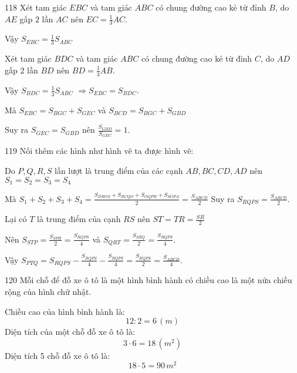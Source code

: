 \begin{Answer}{118}
		Xét tam giác $EBC$ và tam giác $ABC$ có chung đường cao kẻ từ đỉnh $B$, do $AE$ gấp $2$ lần $AC$ nên  $EC=\frac{1}{3}AC.$
		
		Vậy  ${{S}_{EBC}}=\frac{1}{3}{{S}_{ABC}}$
		
		Xét tam giác $BDC$ và tam giác $ABC$ có chung đường cao kẻ từ đỉnh $C$, do $AD$ gấp $2$ lần $BD$ nên  $BD=\frac{1}{3}AB.$
		
		Vậy  ${{S}_{BDC}}=\frac{1}{3}{{S}_{ABC}}$
		$\Rightarrow {{S}_{EBC}}={{S}_{BDC}}$.
		
		Mà  ${{S}_{EBC}}={{S}_{BGC}}+{{S}_{GEC}}$ và  ${{S}_{BCD}}={{S}_{BGC}}+{{S}_{GBD}}$
		
		Suy ra  ${{S}_{GEC}}={{S}_{GBD}}$  nên  $\frac{{{S}_{GBD}}}{{{S}_{GEC}}}=1$.
	
\end{Answer}
\begin{Answer}{119}
		Nối thêm các hình như hình vẽ ta được hình vẽ:
		
		
		Do $P,Q,R,S$ lần lượt là trung điểm của các cạnh $AB,BC,CD,AD$ nên  ${{S}_{1}}={{S}_{2}}={{S}_{3}}={{S}_{4}}$
		
		Mà  ${{S}_{1}}+{{S}_{2}}+{{S}_{3}}+{{S}_{4}}=\frac{{{S}_{DROS}}+{{S}_{RCQO}}+{{S}_{OQPB}}+{{S}_{SOPA}}}{2}=\frac{{{S}_{ABCD}}}{2}$
		Suy ra  ${{S}_{RQPS}}=\frac{{{S}_{ABCD}}}{2}$.
		
		Lại có $T$ là trung điểm của cạnh $RS$ nên  $ST=TR=\frac{SR}{2}$
		
		Nên  ${{S}_{STP}}=\frac{{{S}_{SPR}}}{2}=\frac{{{S}_{RQPS}}}{4}$  và  ${{S}_{QRT}}=\frac{{{S}_{SRQ}}}{2}=\frac{{{S}_{RQPS}}}{4}$.
		
		Vậy  ${{S}_{PTQ}}={{S}_{RQPS}}-\frac{{{S}_{RQPS}}}{4}-\frac{{{S}_{RQPS}}}{4}=\frac{{{S}_{RQPS}}}{2}=\frac{{{S}_{ABCD}}}{4}$.
	
\end{Answer}
\begin{Answer}{120}
		Mỗi chỗ để đỗ xe ô tô là một hình bình hành có chiều cao là một nửa chiều rộng của hình chữ nhật.
		
		Chiều cao của hình bình hành là:
		\[12:2=6 \,(m)\]
		Diện tích của một chỗ đỗ xe ô tô là:
		\[3\cdot6=18 \,(m^2)\]
		Diện tích 5 chỗ đỗ xe ô tô là:
		\[18\cdot5=90 \,m^2\]
	
\end{Answer}
